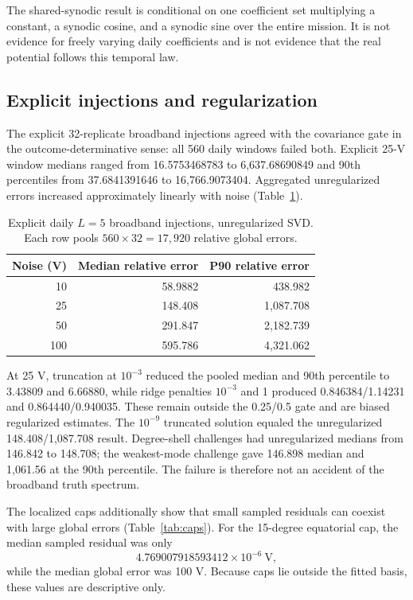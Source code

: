 \documentclass[11pt]{article}
\begin{document}
The shared-synodic result is conditional on one coefficient set multiplying a
constant, a synodic cosine, and a synodic sine over the entire mission.  It is
not evidence for freely varying daily coefficients and is not evidence that
the real potential follows this temporal law.

\subsection{Explicit injections and regularization}

The explicit 32-replicate broadband injections agreed with the covariance
gate in the outcome-determinative sense: all 560 daily windows failed both.
Explicit 25-V window medians ranged from 16.5753468783 to 6,637.68690849 and
90th percentiles from 37.6841391646 to 16,766.9073404.  Aggregated
unregularized errors increased approximately linearly with noise
(Table~\ref{tab:unreg}).

\begin{table}[ht]
\centering
\caption{Explicit daily $L=5$ broadband injections, unregularized SVD.  Each
row pools $560\times32=17,920$ relative global errors.}
\label{tab:unreg}
\begin{tabular}{rrr}
\toprule
Noise (V) & Median relative error & P90 relative error \\
\midrule
10  & 58.9882  & 438.982 \\
25  & 148.408  & 1,087.708 \\
50  & 291.847  & 2,182.739 \\
100 & 595.786  & 4,321.062 \\
\bottomrule
\end{tabular}
\end{table}

At 25 V, truncation at $10^{-3}$ reduced the pooled median and 90th percentile
to 3.43809 and 6.66880, while ridge penalties $10^{-3}$ and 1 produced
0.846384/1.14231 and 0.864440/0.940035.  These remain outside the
0.25/0.5 gate and are biased regularized estimates.  The $10^{-9}$ truncated
solution equaled the unregularized 148.408/1,087.708 result.  Degree-shell
challenges had unregularized medians from 146.842 to 148.708; the weakest-mode
challenge gave 146.898 median and 1,061.56 at the 90th percentile.  The failure
is therefore not an accident of the broadband truth spectrum.

The localized caps additionally show that small sampled residuals can coexist
with large global errors (Table~\ref{tab:caps}).  For the 15-degree equatorial
cap, the median sampled residual was only
\begin{equation*}
4.769007918593412\times10^{-6}\ \mathrm{V},
\end{equation*}
while the median global error was 100 V.  Because caps lie outside the fitted
basis, these values are descriptive only.
\end{document}
